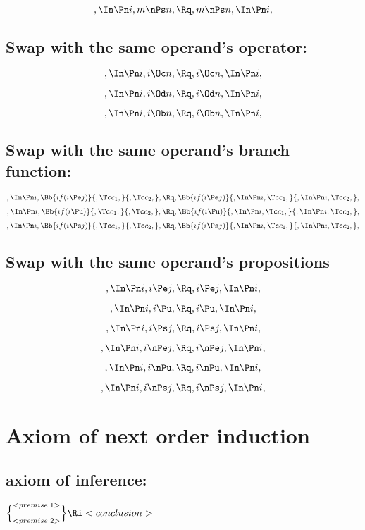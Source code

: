 \[,\In \Pn i, m \nPs n, \Rq , m \nPs n, \In \Pn i,\]


\bigskip
\bigskip
\subsection{Swap with the same operand's operator:}
\[,\In \Pn i, i \Oc n, \Rq , i \Oc n, \In \Pn i,\]

\[,\In \Pn i, i \Od n, \Rq , i \Od n, \In \Pn i,\]

\[,\In \Pn i, i \Ob n, \Rq , i \Ob n, \In \Pn i,\]

\bigskip
\bigskip
\subsection{Swap with the same operand's  branch function:}
\[,\In \Pn i, \Bb{if(i \Pe j)}{,\Tc c_1,}{,\Tc c_2,}, \Rq , \Bb{if(i \Pe j)}{,\In \Pn i, \Tc c_1,}{,\In \Pn i, \Tc c_2,},\]
\bigskip
\bigskip
\[,\In \Pn i, \Bb{if(i \Pu)}{,\Tc c_1,}{,\Tc c_2,}, \Rq , \Bb{if(i \Pu)}{,\In \Pn i, \Tc c_1,}{,\In \Pn i, \Tc c_2,},\]
\bigskip
\bigskip
\[,\In \Pn i, \Bb{if(i \Ps j)}{,\Tc c_1,}{,\Tc c_2,}, \Rq , \Bb{if(i \Ps j)}{,\In \Pn i, \Tc c_1,}{,\In \Pn i, \Tc c_2,},\]


\bigskip
\bigskip
\subsection{Swap with the same operand's propositions}
\[,\In \Pn i, i \Pe j, \Rq , i \Pe j, \In \Pn i,\]

\[,\In \Pn i, i \Pu, \Rq , i \Pu, \In \Pn i,\]

\[,\In \Pn i, i \Ps j, \Rq , i \Ps j, \In \Pn i,\]

\[,\In \Pn i, i \nPe j, \Rq , i \nPe j, \In \Pn i,\]

\[,\In \Pn i, i \nPu, \Rq , i \nPu, \In \Pn i,\]

\[,\In \Pn i, i \nPs j, \Rq , i \nPs j, \In \Pn i,\]


\bigskip
\bigskip
\bigskip
\bigskip
\section{Axiom of next order induction}
\subsection{axiom of inference:}
\begin{math}
\Bigl\{ ^{<premise \; 1>}_{<premise \;  2>}\Bigl\} \Ri <conclusion>
\end{math}
\bigskip
\bigskip
